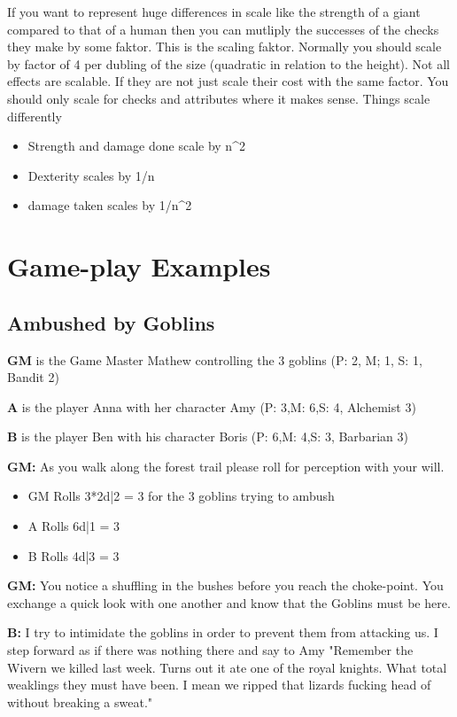 \documentclass[11pt]{article}
\begin{document}
{\begin{multicols}{2}[]
If you want to represent huge differences in scale like the strength of a giant compared to that of a human then you can mutliply the successes of the checks they make by some faktor. This is the scaling faktor. Normally you should scale by factor of 4 per dubling of the size (quadratic in relation to the height). Not all effects are scalable. If they are not just scale their cost with the same factor. You should only scale for checks and attributes where it makes sense.
Things scale differently
\begin{itemize}
\item Strength and damage done scale by n\^{}2
\item Dexterity scales by 1/n
\item damage taken scales by 1/n\^{}2
\end{itemize}


\newpage
\section{Game-play Examples}
\label{sec:org539724b}

\subsection{Ambushed by Goblins}
\label{sec:org53b0479}

\textbf{GM} is the Game Master Mathew controlling the 3 goblins (P: 2, M; 1, S: 1, Bandit 2)

\textbf{A} is the player Anna with her character Amy (P: 3,M: 6,S: 4, Alchemist 3)

\textbf{B} is the player Ben with his character Boris (P: 6,M: 4,S: 3, Barbarian 3)

\textbf{GM:} As you walk along the forest trail please roll for perception with your will.
\begin{itemize}
\item GM Rolls 3*2d|2 = 3 for the 3 goblins trying to ambush
\item A Rolls 6d|1 =  3
\item B Rolls 4d|3 =  3
\end{itemize}

\textbf{GM:} You notice a shuffling in the bushes before you reach the choke-point. You exchange a quick look with one another and know that the Goblins must be here. 

\textbf{B:} I try to intimidate the goblins in order to prevent them from attacking us. I step forward as if there was nothing there and say to Amy "Remember the Wivern we killed last week. Turns out it ate one of the royal knights. What total weaklings they must have been. I mean we ripped that lizards fucking head of without breaking a sweat."


\end{multicols}}
\end{document}
